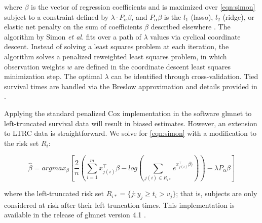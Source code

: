 \documentclass[11pt,final,fleqn]{article}\usepackage[]{graphicx}\usepackage[]{color}
\theoremstyle{plain}
\newcommand{\pkg}[1]{{\fontseries{b}\selectfont #1}}
\begin{document}
where $\beta$ is the vector of regression coefficients and is maximized over \autoref{eqn:simon} subject to a constraint defined by $\lambda \cdot P_{\alpha}\beta$, and $P_{\alpha}\beta$ is the $l_1$ (lasso), $l_2$ (ridge), or elastic net penalty on the sum of coefficients $\beta$ described elsewhere \cite{simon2011regularization, tibshirani1996regression, tikhonov1963ridge, zou2005regularization}. The algorithm by Simon \emph{et al.} fits over a path of $\lambda$ values via cyclical coordinate descent. Instead of solving a least squares problem at each iteration, the algorithm solves a penalized reweighted least squares problem, in which observation weights $w$ are defined in the coordinate descent least squares minimization step. The optimal $\lambda$ can be identified through cross-validation. Tied survival times are handled via the Breslow approximation \cite{breslow1972} and details provided in \cite{simon2011regularization}.

Applying the standard penalized Cox implementation in the software \pkg{glmnet} to left-truncated survival data will result in biased estimates. However, an extension to LTRC data is straightforward. We solve for \autoref{eqn:simon} with a modification to the risk set $R_i$:

\begin{equation}
\hat{\beta} = argmax_{\beta}  \left[ \frac{2}{n} \left( \sum_{i=1}^m x_{j(i)}^\intercal\beta - log\left(\sum_{j(i)\in R_{i\ast}}  e^{x_{j(i)}^\intercal\beta)}\right) \right)  - \lambda P_{\alpha}\beta  \right] 
\end{equation}

where the left-truncated risk set $R_{i\ast} = \{ j : y_j \geq t_i > v_j \}$; that is, subjects are only considered at risk after their left truncation times. This implementation is available in the release of \pkg{glmnet} version 4.1 \cite{glmnet}.
\end{document}
